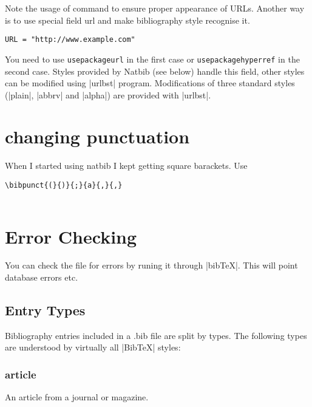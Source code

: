\begin{refsection}
Note the usage of  command to ensure proper appearance of URLs.
Another way is to use special field url and make bibliography style recognise it.

\begin{lstlisting}[language={[common]TeX},% 
                           alsolanguage={[LaTeX]TeX},% 
                           alsolanguage={[primitive]TeX},%
                           ]
URL = "http://www.example.com"
\end{lstlisting}

You need to use \texttt{usepackage{url}} in the first case or \texttt{usepackage{hyperref}} in the second case.
Styles provided by Natbib (see below) handle this field, other styles can be modified using |urlbst| program. Modifications of three standard styles (|plain|, |abbrv| and |alpha|) are provided with |urlbst|.


\section{changing punctuation}

When I started using natbib I kept getting square barackets. Use
\begin{lstlisting}[language={[common]TeX},% 
                           alsolanguage={[LaTeX]TeX},% 
                           alsolanguage={[primitive]TeX},%
                           ]
    \bibpunct{(}{)}{;}{a}{,}{,}
    
\end{lstlisting}

\section{Error Checking}

You can check the file for errors by runing it through |bibTeX|. This will point database errors etc. 


\subsection{Entry Types}

Bibliography entries included in a .bib file are split by types. The following types are understood by virtually all |BibTeX| styles:

\subsubsection*{article}
  An article from a journal or magazine.


\end{refsection}
